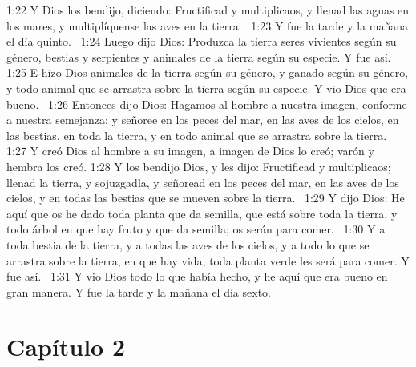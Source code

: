 1:22 Y Dios los bendijo, diciendo: Fructificad y multiplicaos, y llenad las aguas en los mares, y multiplíquense las aves en la tierra.  
1:23 Y fue la tarde y la mañana el día quinto.  
1:24 Luego dijo Dios: Produzca la tierra seres vivientes según su género, bestias y serpientes y animales de la tierra según su especie. Y fue así.  
1:25 E hizo Dios animales de la tierra según su género, y ganado según su género, y todo animal que se arrastra sobre la tierra según su especie. Y vio Dios que era bueno.  
1:26 Entonces dijo Dios: Hagamos al hombre a nuestra imagen, conforme a nuestra semejanza; y señoree en los peces del mar, en las aves de los cielos, en las bestias, en toda la tierra, y en todo animal que se arrastra sobre la tierra.  
1:27 Y creó Dios al hombre a su imagen, a imagen de Dios lo creó; varón y hembra los creó. 
1:28 Y los bendijo Dios, y les dijo: Fructificad y multiplicaos; llenad la tierra, y sojuzgadla, y señoread en los peces del mar, en las aves de los cielos, y en todas las bestias que se mueven sobre la tierra.  
1:29 Y dijo Dios: He aquí que os he dado toda planta que da semilla, que está sobre toda la tierra, y todo árbol en que hay fruto y que da semilla; os serán para comer.  
1:30 Y a toda bestia de la tierra, y a todas las aves de los cielos, y a todo lo que se arrastra sobre la tierra, en que hay vida, toda planta verde les será para comer. Y fue así.  
1:31 Y vio Dios todo lo que había hecho, y he aquí que era bueno en gran manera. Y fue la tarde y la mañana el día sexto. 
 
\section*{Capítulo 2}

